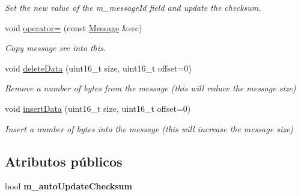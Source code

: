 \begin{DoxyCompactItemize}
\begin{DoxyCompactList}\small\item\em \-Set the new value of the m\-\_\-message\-Id field and update the checksum. \end{DoxyCompactList}\item 
\hypertarget{classxsens_1_1Message_ae11b4526159c0ac3f8224310dfa29506}{void \hyperlink{classxsens_1_1Message_ae11b4526159c0ac3f8224310dfa29506}{operator=} (const \hyperlink{classxsens_1_1Message}{\-Message} \&src)}\label{classxsens_1_1Message_ae11b4526159c0ac3f8224310dfa29506}

\begin{DoxyCompactList}\small\item\em \-Copy message src into this. \end{DoxyCompactList}\item 
\hypertarget{classxsens_1_1Message_a2eaac6d61336fda6dc93ad2ef0106c9b}{void \hyperlink{classxsens_1_1Message_a2eaac6d61336fda6dc93ad2ef0106c9b}{delete\-Data} (uint16\-\_\-t size, uint16\-\_\-t offset=0)}\label{classxsens_1_1Message_a2eaac6d61336fda6dc93ad2ef0106c9b}

\begin{DoxyCompactList}\small\item\em \-Remove a number of bytes from the message (this will reduce the message size) \end{DoxyCompactList}\item 
\hypertarget{classxsens_1_1Message_a2b6a34eb1b5156708e57d885157d9994}{void \hyperlink{classxsens_1_1Message_a2b6a34eb1b5156708e57d885157d9994}{insert\-Data} (uint16\-\_\-t size, uint16\-\_\-t offset=0)}\label{classxsens_1_1Message_a2b6a34eb1b5156708e57d885157d9994}

\begin{DoxyCompactList}\small\item\em \-Insert a number of bytes into the message (this will increase the message size) \end{DoxyCompactList}\end{DoxyCompactItemize}
\subsection*{\-Atributos públicos}
\begin{DoxyCompactItemize}
\item 
\hypertarget{classxsens_1_1Message_a06bd7ab2d3699aef33cdcffd7b1ff5c4}{bool {\bfseries m\-\_\-auto\-Update\-Checksum}}\label{classxsens_1_1Message_a06bd7ab2d3699aef33cdcffd7b1ff5c4}

\end{DoxyCompactItemize}
